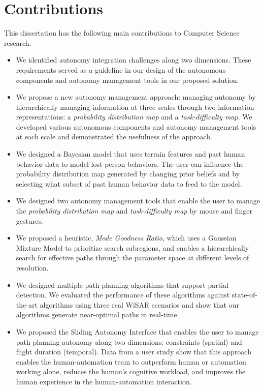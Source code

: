 \section{Contributions}
\label{contributions}

This dissertation has the following main contributions to Computer Science research.

\begin{itemize}
\item We identified autonomy integration challenges along two dimensions. These requirements served as a guideline in our design of the autonomous components and autonomy management tools in our proposed solution.
\item We propose a new autonomy management approach: managing autonomy by hierarchically managing information at three scales through two information representations: a \textit{probability distribution map} and a \textit{task-difficulty map}. We developed various autonomous components and autonomy management tools at each scale and demonstrated the usefulness of the approach.
\item We designed a Bayesian model that uses terrain features and past human behavior data to model lost-person behaviors. The user can influence the probability distribution map generated by changing prior beliefs and by selecting what subset of past human behavior data to feed to the model.
\item We designed two autonomy management tools that enable the user to manage the \textit{probability distribution map} and \textit{task-difficulty map} by mouse and finger gestures.
\item We proposed a heuristic, \textit{Mode Goodness Ratio}, which uses a Gaussian Mixture Model to prioritize search subregions, and enables a hierarchically search for effective paths through the parameter space at different levels of resolution.
\item We designed multiple path planning algorithms that support partial detection. We evaluated the performance of these algorithms against state-of-the-art algorithms using three real WiSAR scenarios and show that our algorithms generate near-optimal paths in real-time.
\item We proposed the Sliding Autonomy Interface that enables the user to manage path planning autonomy along two dimensions: constraints (spatial) and flight duration (temporal). Data from a user study show that this approach enables the human-automation team to outperform human or automation working alone, reduces the human's cognitive workload, and improves the human experience in the human-automation interaction.
\end{itemize}


